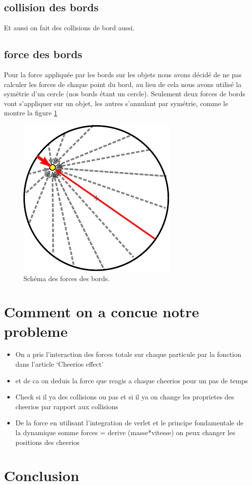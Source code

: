 \documentclass[a4paper, 11pt, oneside]{article} %
\begin{document}
    \subsection{collision des bords}
        Et aussi on fait des collisions de bord aussi.
    \subsection{force des bords}
        Pour la force appliquée par les bords sur les objets nous avons décidé de ne pas calculer les forces de chaque point du bord, au lieu de cela nous avons utilisé la symétrie d'un cercle (nos bords étant un cercle). Seulement deux forces de bords vont s'appliquer sur un objet, les autres s'annulant par symétrie, comme le montre la figure \ref{Force_Bord_schéma}
        \begin{figure}[!htb]
            \centering
            \includegraphics{Figure_Force_Bord.pdf}
            \caption{Schéma des forces des bords.}
            \label{Force_Bord_schéma}
        \end{figure}
            


\section{Comment on a concue notre probleme}
    \begin{itemize}
        \item On a pris l'interaction des forces totale sur chaque particule par la fonction dans l'article `Cheerios effect'
        \item et de ca on deduis la force que reagis a chaque cheerios pour un pas de temps 
        \item Check si il ya des collisions ou pas et si il ya on change les proprietes des cheerios par rapport aux collisions
        \item De la force en utilisant l'integration de verlet et le principe fondamentale de la dynamique somme forces = derive (masse*vitesse) on peux changer les positions des cheerios
    \end{itemize}
\section*{Conclusion}

\newpage
\thispagestyle{empty}
\nocite{*}
\printbibliography[title = Bibliographie]
\end{document}
